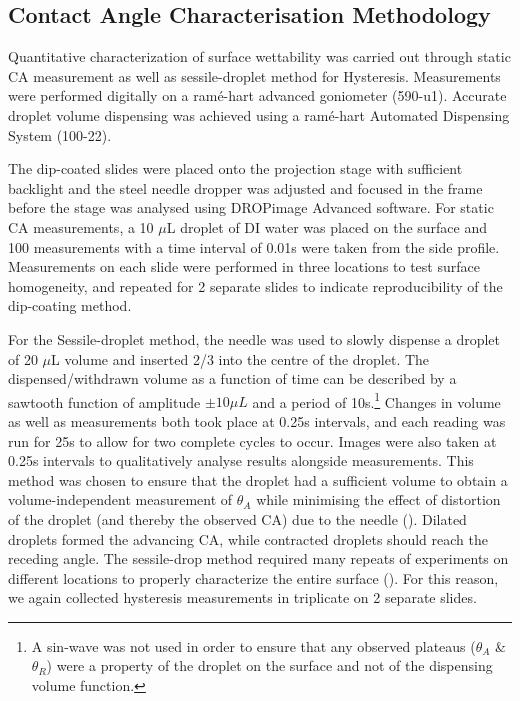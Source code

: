 \subsection{Contact Angle Characterisation Methodology}
Quantitative characterization of surface wettability was carried out through static CA measurement as well as sessile-droplet method for Hysteresis. Measurements were performed digitally on a ramé-hart advanced goniometer (590-u1). Accurate droplet volume dispensing was achieved using a ramé-hart Automated Dispensing System (100-22). 
\par The dip-coated slides were placed onto the projection stage with sufficient backlight and the steel needle dropper was adjusted and focused in the frame before the stage was analysed using DROPimage Advanced software. For static CA measurements, a 10 $\mu$L droplet of DI water was placed on the surface and 100 measurements with a time interval of 0.01s were taken from the side profile. Measurements on each slide were performed in three locations to test surface homogeneity, and repeated for 2 separate slides to indicate reproducibility of the dip-coating method.
\par For the Sessile-droplet method,  the needle was used to slowly dispense a droplet of 20 $\mu$L volume and inserted 2/3 into the centre of the droplet. The dispensed/withdrawn volume as a function of time can be described by a sawtooth function of amplitude $\pm10\mu L$ and a period of 10s.\footnote{A sin-wave was not used in order to ensure that any observed plateaus ($\theta_A$ \& $\theta_R$) were a property of the droplet on the surface and not of the dispensing volume function.} Changes in volume as well as measurements both took place at 0.25s intervals, and each reading was run for 25s to allow for two complete cycles to occur.  Images were also taken at 0.25s intervals to qualitatively analyse results alongside measurements. This method was chosen to ensure that the droplet had a sufficient volume to obtain a volume-independent measurement of $\theta_A$ while minimising the effect of distortion of the droplet (and thereby the observed CA) due to the needle (\cite{eral}).
Dilated droplets formed the advancing CA, while contracted droplets should reach the receding angle. The sessile-drop method required many repeats of experiments on different locations to properly characterize the entire surface (\cite{eral}). For this reason, we again collected hysteresis measurements in triplicate on 2 separate slides. 

